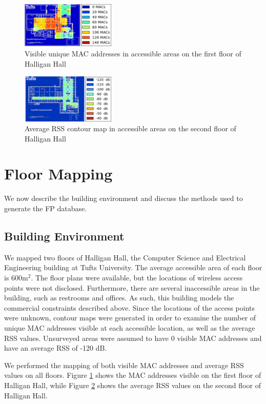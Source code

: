 \documentclass[conference]{IEEEtran}
\begin{document}
\begin{figure}[t!]
  \centering
    \includegraphics[width=0.4\textwidth]{APContour}
    \caption{Visible unique MAC addresses in accessible areas on the first floor of Halligan Hall}
    \label{fig:visible_unique_macs}
\end{figure}


\begin{figure}[t!]
  \centering
    \includegraphics[width=0.4\textwidth]{dbContour}
   \caption{Average RSS contour map in accessible areas on the second floor of Halligan Hall}
   \label{fig:rss_contour_map}
\end{figure}

\section{Floor Mapping}
We now describe the building environment and discuss the methods used to generate the FP database.
\subsection{Building Environment}
We mapped two floors of Halligan Hall, the Computer Science and Electrical Engineering building at Tufts University. The average accessible area of each floor is 600m$^2$. The floor plans were available, but the locations of wireless access points were not disclosed. Furthermore, there are several inaccessible areas in the building, such as restrooms and offices. As such, this building models the commercial constraints described above. Since the locations of the access points were unknown, contour maps were generated in order to examine the number of unique MAC addresses visible at each accessible location, as well as the average RSS values. Unsurveyed areas were assumed to have 0 visible MAC addresses and have an average RSS of -120 dB. 

We performed the mapping of both visible MAC addresses and average RSS values on all floors. Figure \ref{fig:visible_unique_macs} shows the MAC addresses visible on the first floor of Halligan Hall, while Figure \ref{fig:rss_contour_map} shows the average RSS values on the second floor of Halligan Hall.
\end{document}
